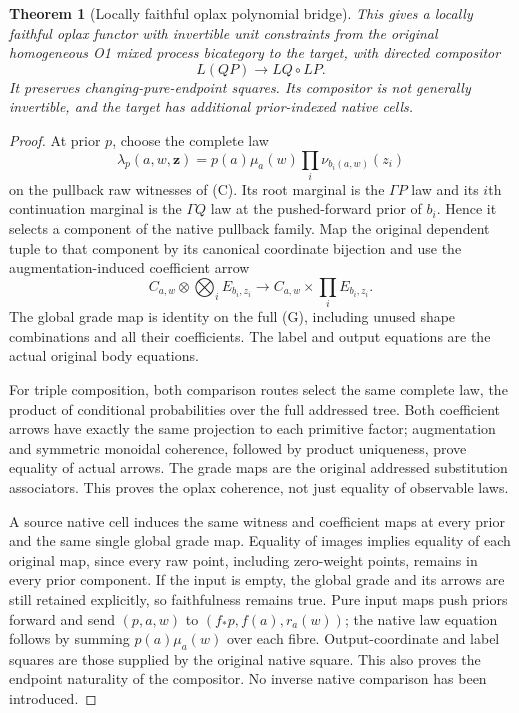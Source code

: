 \documentclass[11pt]{article}
\newtheorem{theorem}{Theorem}\newtheorem{proposition}[theorem]{Proposition}
\begin{document}
\begin{theorem}[Locally faithful oplax polynomial bridge]
This gives a locally faithful oplax functor with invertible unit constraints from the original homogeneous O1 mixed process bicategory to the target, with directed compositor
\[
 L(QP)\longrightarrow LQ\circ LP.
\]
It preserves changing-pure-endpoint squares. Its compositor is not generally invertible, and the target has additional prior-indexed native cells.
\end{theorem}
\begin{proof}
At prior $p$, choose the complete law
\[
 \lambda_p(a,w,\mathbf z)=p(a)\mu_a(w)\prod_i\nu_{b_i(a,w)}(z_i)
\]
on the pullback raw witnesses of (C). Its root marginal is the $\Gamma P$ law and its $i$th continuation marginal is the $\Gamma Q$ law at the pushed-forward prior of $b_i$. Hence it selects a component of the native pullback family. Map the original dependent tuple to that component by its canonical coordinate bijection and use the augmentation-induced coefficient arrow
\[
 C_{a,w}\otimes\bigotimes_i E_{b_i,z_i}
 \longrightarrow C_{a,w}\times\prod_i E_{b_i,z_i}.
\]
The global grade map is identity on the full (G), including unused shape combinations and all their coefficients. The label and output equations are the actual original body equations.

For triple composition, both comparison routes select the same complete law, the product of conditional probabilities over the full addressed tree. Both coefficient arrows have exactly the same projection to each primitive factor; augmentation and symmetric monoidal coherence, followed by product uniqueness, prove equality of actual arrows. The grade maps are the original addressed substitution associators. This proves the oplax coherence, not just equality of observable laws.

A source native cell induces the same witness and coefficient maps at every prior and the same single global grade map. Equality of images implies equality of each original map, since every raw point, including zero-weight points, remains in every prior component. If the input is empty, the global grade and its arrows are still retained explicitly, so faithfulness remains true. Pure input maps push priors forward and send $(p,a,w)$ to $(f_*p,f(a),r_a(w))$; the native law equation follows by summing $p(a)\mu_a(w)$ over each fibre. Output-coordinate and label squares are those supplied by the original native square. This also proves the endpoint naturality of the compositor. No inverse native comparison has been introduced.
\end{proof}
\end{document}
